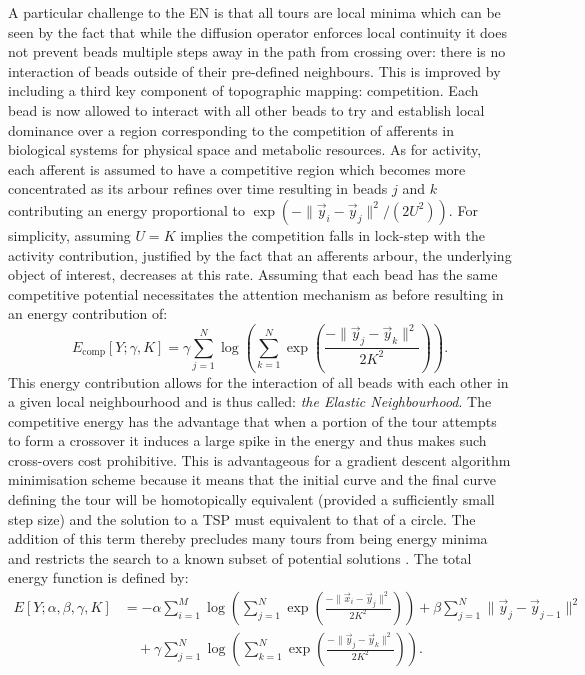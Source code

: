 A particular challenge to the EN is that all tours are local minima which can be seen by the fact that while the diffusion operator enforces local continuity it does not prevent beads multiple steps away in the path from crossing over: there is no interaction of beads outside of their pre-defined neighbours. This is improved by including a third key component of topographic mapping: competition. Each bead is now allowed to interact with all other beads to try and establish local dominance over a region corresponding to the competition of afferents in biological systems for physical space and metabolic resources. As for activity, each afferent is assumed to have a competitive region which becomes more concentrated as its arbour refines over time resulting in beads $j$ and $k$ contributing an energy proportional to $\exp\left ( - \lVert \vec{y}_i - \vec{y}_j \rVert^2 / (2 U^2)  \right)$. For simplicity, assuming $U = K$ implies the competition falls in lock-step with the activity contribution, justified by the fact that an afferents arbour, the underlying object of interest, decreases at this rate. Assuming that each bead has the same competitive potential necessitates the attention mechanism as before resulting in an energy contribution of: 
\begin{equation} \label{eq:compneighbourenergy}
E_\text{comp}[Y; \gamma, K]  = \gamma \sum_{j = 1}^{N} \log \left( \sum_{k=1}^N \exp\left ( \frac{- \lVert \vec{y}_j - \vec{y}_k \rVert^2 }{ 2 K^2 }  \right) \right).
\end{equation}
This energy contribution allows for the interaction of all beads with each other in a given local neighbourhood and is thus called: \textit{the Elastic Neighbourhood}. The competitive energy has the advantage that when a portion of the tour attempts to form a crossover it induces a large spike in the energy and thus makes such cross-overs cost prohibitive. This is advantageous for a gradient descent algorithm minimisation scheme because it means that the initial curve and the final curve defining the tour will be homotopically equivalent (provided a sufficiently small step size) and the solution to a TSP must equivalent to that of a circle. The addition of this term thereby precludes many tours from being energy minima and restricts the search to a known subset of potential solutions \cite{Applegate2007-nz}. The total energy function is defined by:
\begin{equation} \label{eq:totalneighbourenergy}
\begin{split}
E[Y; \alpha, \beta, \gamma, K] &= -\alpha \sum_{i = 1}^{M} \log \left( \sum_{j=1}^N \exp\left ( \frac{- \lVert \vec{x}_i - \vec{y}_j \rVert^2 }{ 2 K^2 }  \right) \right) + \beta \sum_{j=1}^{N} \lVert \vec{y}_j - \vec{y}_{j-1} \rVert^2  \\ 
& \quad + \gamma \sum_{j = 1}^{N} \log \left( \sum_{k=1}^N \exp\left ( \frac{- \lVert \vec{y}_j - \vec{y}_k \rVert^2 }{ 2 K^2 }  \right) \right).
\end{split}
\end{equation}
